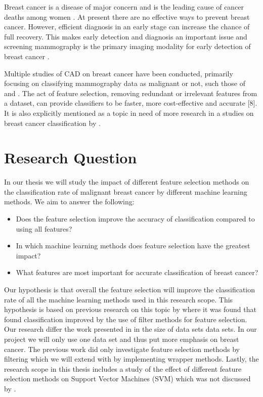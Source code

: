 \documentclass{kththesis}
\begin{document}
Breast cancer is a disease of major concern and is the leading cause of cancer deaths among women \parencite{althuis2005}. At present there are no effective ways to prevent breast cancer. However, efficient diagnosis in an early stage can increase the chance of full recovery. This makes early detection and diagnosis an important issue and screening mammography is the primary imaging modality for early detection of breast cancer \parencite{tabar2001}.

Multiple studies of CAD on breast cancer have been conducted, primarily focusing on classifying mammography data as malignant or not, such those of \textcite{ramos2012} and \textcite{akay2009}. The act of feature selection, removing redundant or irrelevant features from a dataset, can provide classifiers to be faster, more cost-effective and accurate [8]. It is also explicitly mentioned as a topic in need of more research in a studies on breast cancer classification by \textcite{akin2011}.

\section{Research Question}

In our thesis we will study the impact of different feature selection methods on the classification rate of malignant breast cancer by different machine learning methods. We aim to answer the following:

\begin{itemize}
  \item Does the feature selection improve the accuracy of classification compared to using all features?
  \item In which machine learning methods does feature selection have the greatest impact?
  \item What features are most important for accurate classification of breast cancer?
\end{itemize}
   Our hypothesis is that overall the feature selection will improve the classification rate of all the machine learning methods used in this research scope. This hypothesis is based on previous research on this topic by \textcite{karabulut2012} where it was found that found classification improved by the use of filter methods for feature selection.
Our research differ the work presented in \parencite{karabulut2012} in the size of data sets data sets. In our project we will only use one data set and thus put more emphasis on breast cancer. The previous work did only investigate feature selection methods by filtering which we will extend with by implementing wrapper methods. Lastly, the research scope in this thesis includes a study of the effect of different feature selection methods on Support Vector Machines (SVM) which was not discussed by \parencite{karabulut2012}.
\end{document}
